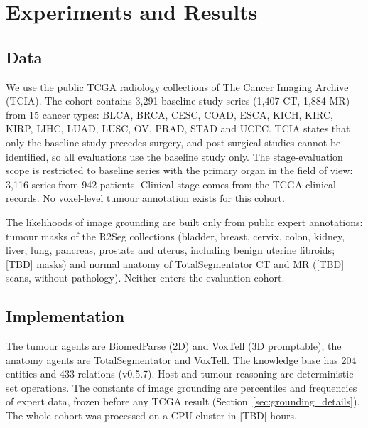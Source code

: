 \documentclass[fleqn,10pt]{olplainarticle}
\begin{document}
\section{Experiments and Results}
\label{sec:results}

\subsection{Data}
We use the public TCGA radiology collections of The Cancer Imaging Archive (TCIA). The cohort contains 3{,}291
baseline-study series (1{,}407 CT, 1{,}884 MR) from 15 cancer types: BLCA, BRCA, CESC, COAD, ESCA, KICH, KIRC, KIRP,
LIHC, LUAD, LUSC, OV, PRAD, STAD and UCEC. TCIA states that only the baseline study precedes surgery, and post-surgical
studies cannot be identified, so all evaluations use the baseline study only. The stage-evaluation scope is restricted
to baseline series with the primary organ in the field of view: 3{,}116 series from 942 patients. Clinical stage comes
from the TCGA clinical records. No voxel-level tumour annotation exists for this cohort.

The likelihoods of image grounding are built only from public expert annotations: tumour masks of the R2Seg collections
(bladder, breast, cervix, colon, kidney, liver, lung, pancreas, prostate and uterus, including benign uterine fibroids;
[TBD] masks) and normal anatomy of
TotalSegmentator CT and MR ([TBD] scans, without pathology). Neither enters the evaluation cohort.

\subsection{Implementation}
The tumour agents are BiomedParse (2D) and VoxTell (3D promptable); the anatomy agents are TotalSegmentator and VoxTell. The
knowledge base has 204 entities and 433 relations (v0.5.7). Host and tumour reasoning are deterministic set operations.
The constants of image grounding are percentiles and frequencies of expert data, frozen before any TCGA result
(Section~\ref{sec:grounding_details}). The whole cohort was processed on a CPU cluster in [TBD] hours.
\end{document}
